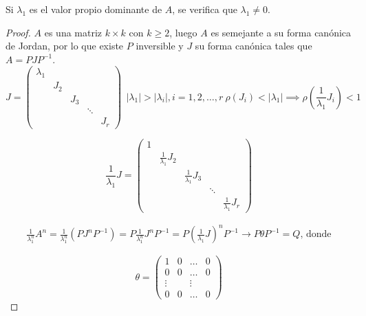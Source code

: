\begin{nota}
	Si $\lambda_1$ es el valor propio dominante de $A$, se verifica que $\lambda_1 \ne 0$.
\end{nota}

\begin{proof}
    $A$ es una matriz $k \times k$ con $k \geq 2$, luego $A$ es semejante a su forma  canónica de Jordan, por lo que existe $P$ inversible y $J$ su forma canónica tales que $A = PJP^{-1}$.
    $$J = \begin{pmatrix}
        \lambda_1 & & & & \\
                  & J_2 & & & \\
                  & & J_3 & & \\
                  & & & \ddots & \\
                  & & & & J_r
    \end{pmatrix} \ \ |\lambda_1| > |\lambda_i|, i = 1, 2, \hdots, r \ \rho(J_i) < |\lambda_1| \implies \rho \left(\frac{1}{\lambda_1}J_i\right) < 1$$

    $$\frac{1}{\lambda_1}J = \begin{pmatrix}
        1 & & & &\\
          & \frac{1}{\lambda_1}J_2 & & &\\
          & & \frac{1}{\lambda_1}J_3 & & \\
          & & & \ddots & \\
          & & & & \frac{1}{\lambda_1}J_r
    \end{pmatrix}$$

    \begin{align*}
        \label{}
        \frac{1}{\lambda_1^n} A^n = \frac{1}{\lambda_1^n}(PJ^nP^{-1}) = P \frac{1}{\lambda_1^n}J^nP^{-1} = P\left(\frac{1}{\lambda_1}J\right)^nP^{-1} \to P\theta P^{-1} = Q \text{, donde}
    \end{align*}

    $$\theta = \begin{pmatrix}
        1 & 0 & \hdots & 0 \\
        0 & 0 & \hdots & 0 \\
        \vdots & & \vdots & \\
        0 & 0 & \hdots & 0
    \end{pmatrix}$$


\end{proof}
